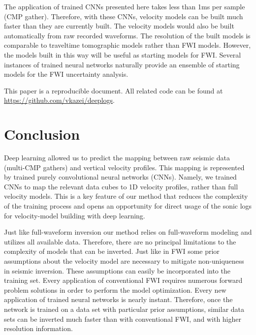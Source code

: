 \documentclass[paper,twocolomn]{geophysics}
\begin{document}
The application of trained CNNs presented here takes less than 1ms per sample (CMP gather). Therefore, with these CNNs, velocity models can be built much faster than they are currently built. The velocity models would also be built automatically from raw recorded waveforms. The resolution of the built models is comparable to traveltime tomographic models rather than FWI models. However, the models built in this way will be useful as starting models for FWI. Several instances of trained neural networks naturally provide an ensemble of starting models for the FWI uncertainty analysis.

This paper is a reproducible document. All related code can be found at \\ \href{https://github.com/vkazei/deeplogs}{https://github.com/vkazei/deeplogs}.

\section{Conclusion}

Deep learning allowed us to predict the mapping between raw seismic data (multi-CMP gathers) and vertical velocity profiles. This mapping is represented by trained purely convolutional neural networks (CNNs). Namely, we trained CNNs to map the relevant data cubes to 1D velocity profiles, rather than full velocity models. This is a key feature of our method that reduces the complexity of the training process and opens an opportunity for direct usage of the sonic logs for velocity-model building with deep learning.
 
Just like full-waveform inversion our method relies on full-waveform modeling and utilizes all available data. Therefore, there are no principal limitations to the complexity of models that can be inverted. Just like in FWI some prior assumptions about the velocity model are necessary to mitigate non-uniqueness in seismic inversion. These assumptions can easily be incorporated into the training set. Every application of conventional FWI requires numerous forward problem solutions in order to perform the model optimization. Every new application of trained neural networks is nearly instant. Therefore, once the network is trained on a data set with particular prior assumptions, similar data sets can be inverted much faster than with conventional FWI, and with higher resolution information.



\end{document}
